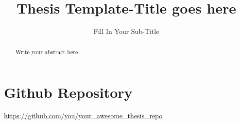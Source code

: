 \documentclass[ds,draftmargins]{mscthesis}
\title{Thesis Template-Title goes here}
\subtitle{Fill In Your Sub-Title}
\begin{document}
\pagestyle{plain}

\maketitlepage
\fixemptypage
\setcounter{page}{0}


\begin{abstract}
Write your abstract here.
\end{abstract}

\maketitle

\section*{Github Repository}
\url{https://github.com/you/your_awesome_thesis_repo}











\newpage

\onecolumn
\newpage

\newpage
\twocolumn
\end{document}
